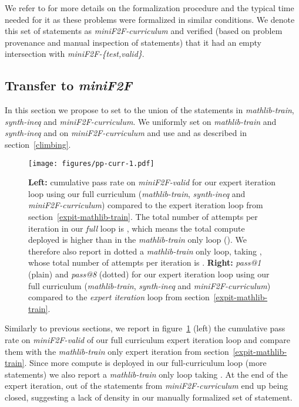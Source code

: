 \documentclass[nohyperref]{article}
\theoremstyle{plain}
\theoremstyle{definition}
\theoremstyle{remark}
\begin{document}
We refer to \citet{zheng2021minif2f} for more details on the formalization procedure and the typical time needed for it as these problems were formalized in similar conditions. We denote this set of statements as \textit{miniF2F-curriculum} and verified (based on problem provenance and manual inspection of statements) that it had an empty intersection with \textit{miniF2F-\{test,valid\}}.

\subsection{Transfer to \textit{miniF2F}}

In this section we propose to set  to the union of the statements in \textit{mathlib-train}, \textit{synth-ineq} and \textit{miniF2F-curriculum}. We uniformly set  on \textit{mathlib-train} and \textit{synth-ineq} and  on \textit{miniF2F-curriculum} and use  and  as described in section~\ref{climbing}.

\begin{figure}[ht]
    \begin{center}
    \centerline{\texttt{[image: figures/pp-curr-1.pdf]}}
    \caption{{\bf Left:} cumulative pass rate on \textit{miniF2F-valid} for our expert iteration loop using our full curriculum (\textit{mathlib-train}, \textit{synth-ineq} and \textit{miniF2F-curriculum}) compared to the expert iteration loop from section~\ref{expit-mathlib-train}. The total number of attempts per iteration in our \textit{full} loop is , which means the total compute deployed is higher than in the \textit{mathlib-train} only loop (). We therefore also report in dotted a \textit{mathlib-train} only loop, taking , whose total number of attempts per iteration is . {\bf Right:} \textit{pass@1} (plain) and \textit{pass@8} (dotted) for our expert iteration loop using our full curriculum (\textit{mathlib-train}, \textit{synth-ineq} and \textit{miniF2F-curriculum}) compared to the \textit{expert iteration} loop from section~\ref{expit-mathlib-train}.}
    \label{fig:pp-curr-1}
    \end{center}
\end{figure}

Similarly to previous sections, we report in figure~\ref{fig:pp-curr-1} (left) the cumulative pass rate on \textit{miniF2F-valid} of our full curriculum expert iteration loop and compare them with the \textit{mathlib-train} only expert iteration from section~\ref{expit-mathlib-train}. Since more compute is deployed in our full-curriculum loop (more statements) we also report a \textit{mathlib-train} only loop taking . At the end of the expert iteration,  out of the  statements from \textit{miniF2F-curriculum} end up being closed, suggesting a lack of density in our manually formalized set of statement. 
\end{document}
